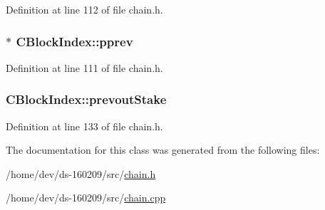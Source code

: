Definition at line 112 of file chain.\+h.

\hypertarget{class_c_block_index_a1ef11137155df1dd5c81491630cece39}{}
\subsubsection[{pprev}]{$\ast$ C\+Block\+Index\+::pprev}\label{class_c_block_index_a1ef11137155df1dd5c81491630cece39}


Definition at line 111 of file chain.\+h.

\hypertarget{class_c_block_index_ac2c040d5e3db73a5ceb87ee4095a405f}{}
\subsubsection[{prevout\+Stake}]{ C\+Block\+Index\+::prevout\+Stake}\label{class_c_block_index_ac2c040d5e3db73a5ceb87ee4095a405f}


Definition at line 133 of file chain.\+h.



The documentation for this class was generated from the following files\+:\begin{DoxyCompactItemize}
\item 
/home/dev/ds-\/160209/src/\hyperlink{chain_8h}{chain.\+h}\item 
/home/dev/ds-\/160209/src/\hyperlink{chain_8cpp}{chain.\+cpp}\end{DoxyCompactItemize}
